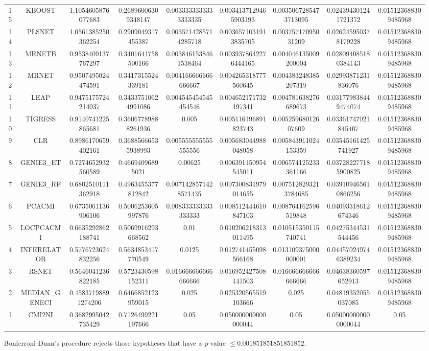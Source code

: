 \documentclass[a4paper,10pt]{article}
\begin{document}
\begin{landscape}
\begin{table}[!htp]
\begin{tabular}{ccccccccc}
15&KBOOST&1.1054605876077683&0.26896006309348147&0.0033333333333333335&0.0034137129465903193&0.0035067285473713095&0.024394301241721372&0.015123688309485968\\
14&PLSNET&1.0561385250362254&0.2909049317455387&0.0035714285714285718&0.0036571031913835705&0.00375717095031209&0.026245950378179228&0.015123688309485968\\
13&MRNETB&0.9538409137767297&0.3401641758500166&0.0038461538461538464&0.0039378642276444165&0.004046135009200004&0.028094085180384143&0.015123688309485968\\
12&MRNET&0.9507495024474591&0.3417315524339181&0.004166666666666667&0.004265318777560645&0.004383248385207319&0.02993871231836076&0.015123688309485968\\
11&LEAP&0.9475175724214037&0.34337510624991086&0.004545454545454546&0.004652171732197341&0.004781638276689673&0.031779838449474074&0.015123688309485968\\
10&TIGRESS&0.9140741225865681&0.36067789888261936&0.005&0.005116196891823743&0.00525968012607609&0.03361747021845407&0.015123688309485968\\
9&CLR&0.8986170659402161&0.36885666535938993&0.005555555555555556&0.005683044988048058&0.005843911024153359&0.03545161425741927&0.015123688309485968\\
8&GENIE3_ET&0.7274652932560589&0.46694096895021&0.00625&0.006391150954545011&0.006574125233361166&0.037282277185900825&0.015123688309485968\\
7&GENIE3_RF&0.6802510111362918&0.4963455377812842&0.0071428571428571435&0.007300831979014655&0.0075128293213784685&0.039109465610866256&0.015123688309485968\\
6&PCACMI&0.6735061136906106&0.5006253605997876&0.008333333333333333&0.008512444610847103&0.008764162596519848&0.04093318612674346&0.015123688309485968\\
5&LOCPCACMI&0.6635292862188741&0.5069916293668562&0.01&0.010206218313011495&0.010515350115740741&0.04275344531544456&0.015123688309485968\\
4&INFERELATOR&0.5776723624832256&0.5634853417770549&0.0125&0.012741455098566168&0.013109375000000001&0.044570249746389234&0.015123688309485968\\
3&RSNET&0.5646041236822185&0.5723430598152311&0.016666666666666666&0.016952427508441503&0.016666666666666666&0.04638360597652913&0.015123688309485968\\
2&MEDIAN_GENECI&0.45837198891274206&0.6466852123959015&0.025&0.025320565519103666&0.025&0.04819352055037085&0.015123688309485968\\
1&CMI2NI&0.3682995042735429&0.7126499221197666&0.05&0.050000000000000044&0.05&0.050000000000000044&0.05\\
\hline
\end{tabular}
\end{table}
Bonferroni-Dunn's procedure rejects those hypotheses that have a p-value $\le0.001851851851851852$.



\end{landscape}
\end{document}
